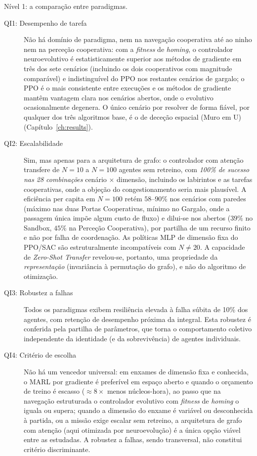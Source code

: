 \documentclass[12pt,reqno, twoside]{amsbook}
\makeatletter
\def\paragraph{\@startsection{paragraph}{4}%
  \z@\z@{-\fontdimen2\font}%
  {\normalfont\bfseries}}
\theoremstyle{plain}
\numberwithin{equation}{chapter}
\numberwithin{section}{chapter}
\numberwithin{table}{chapter}
\numberwithin{figure}{chapter}
\makeatother
\begin{document}
\paragraph{Nível 1: a comparação entre paradigmas.}
\begin{description}
    \item[QI1: Desempenho de tarefa] Não há domínio de paradigma, nem na navegação cooperativa até ao ninho nem na perceção cooperativa: com a \textit{fitness} de \textit{homing}, o controlador neuroevolutivo é estatisticamente superior aos métodos de gradiente em três dos sete cenários (incluindo os dois cooperativos com magnitude comparável) e indistinguível do PPO nos restantes cenários de gargalo; o PPO é o mais consistente entre execuções e os métodos de gradiente mantêm vantagem clara nos cenários abertos, onde o evolutivo ocasionalmente degenera. O único cenário por resolver de forma fiável, por qualquer dos três algoritmos base, é o de deceção espacial (Muro em U) (Capítulo~\ref{ch:results}).
    \item[QI2: Escalabilidade] Sim, mas apenas para a arquitetura de grafo: o controlador com atenção transfere de $N=10$ a $N=100$ agentes sem retreino, com \emph{100\% de sucesso nas 28 combinações} cenário $\times$ dimensão, incluindo os labirintos e as tarefas cooperativas, onde a objeção do congestionamento seria mais plausível. A eficiência per capita em $N=100$ retém $58$--$90\%$ nos cenários com paredes (máximo nas duas Portas Cooperativas, mínimo no Gargalo, onde a passagem única impõe algum custo de fluxo) e dilui-se nos abertos ($39\%$ no Sandbox, $45\%$ na Perceção Cooperativa), por partilha de um recurso finito e não por falha de coordenação. As políticas MLP de dimensão fixa do PPO/SAC são estruturalmente incompatíveis com $N\neq 20$. A capacidade de \textit{Zero-Shot Transfer} revelou-se, portanto, uma propriedade da \emph{representação} (invariância à permutação do grafo), e não do algoritmo de otimização.
    \item[QI3: Robustez a falhas] Todos os paradigmas exibem resiliência elevada à falha súbita de 10\% dos agentes, com retenção de desempenho próxima da integral. Esta robustez é conferida pela partilha de parâmetros, que torna o comportamento coletivo independente da identidade (e da sobrevivência) de agentes individuais.
    \item[QI4: Critério de escolha] Não há um vencedor universal: em enxames de dimensão fixa e conhecida, o MARL por gradiente é preferível em espaço aberto e quando o orçamento de treino é escasso ($\approx 8\times$ menos núcleos-hora), ao passo que na navegação estruturada o controlador evolutivo com \textit{fitness} de \textit{homing} o iguala ou supera; quando a dimensão do enxame é variável ou desconhecida à partida, ou a missão exige escalar sem retreino, a arquitetura de grafo com atenção (aqui otimizada por neuroevolução) é a única opção viável entre as estudadas. A robustez a falhas, sendo transversal, não constitui critério discriminante.
\end{description}
\end{document}
